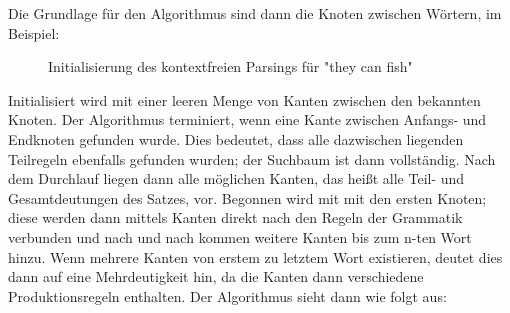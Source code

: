 \documentclass[12pt]{report}
\begin{document}
Die Grundlage für den Algorithmus sind dann die Knoten zwischen Wörtern, im Beispiel: \\
\begin{figure}
\begin{center}
\caption{Initialisierung des kontextfreien Parsings für "they can fish"}
\end{center}
\end{figure}
Initialisiert wird mit einer leeren Menge von Kanten zwischen den bekannten Knoten. Der Algorithmus terminiert, wenn eine Kante zwischen Anfangs- und Endknoten gefunden wurde. Dies bedeutet, dass alle dazwischen liegenden Teilregeln ebenfalls gefunden wurden; der Suchbaum ist dann vollständig. Nach dem Durchlauf liegen dann alle möglichen Kanten, das heißt alle Teil- und Gesamtdeutungen des Satzes, vor. Begonnen wird mit mit den ersten Knoten; diese werden dann mittels Kanten direkt nach den Regeln der Grammatik verbunden und nach und nach kommen weitere Kanten bis zum n-ten Wort hinzu. Wenn mehrere Kanten von erstem zu letztem Wort existieren, deutet dies dann auf eine Mehrdeutigkeit hin, da die Kanten dann verschiedene Produktionsregeln enthalten. Der Algorithmus sieht dann wie folgt aus:
\end{document}
